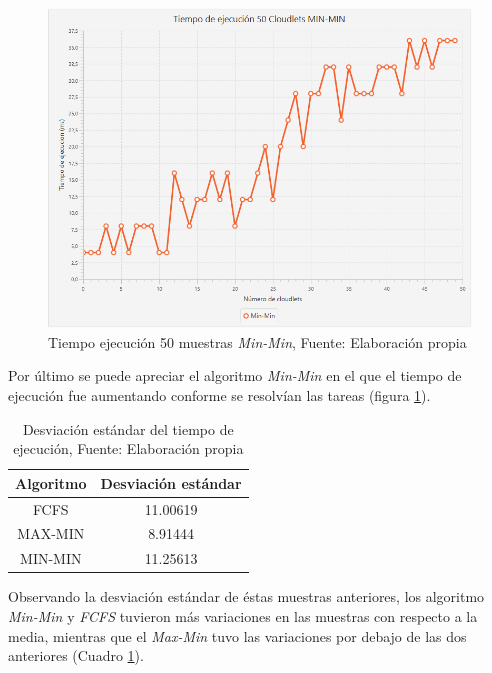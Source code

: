 \newpage
\setcounter{figure}{18}
\renewcommand\thefigure{\arabic{figure}}
\begin{figure}[h!] 
	\centering
	\includegraphics[scale=0.5]{media/min-min}
	\caption{Tiempo ejecuci\'on 50 muestras \textit{Min-Min}, Fuente: Elaboraci\'on propia}
	\label{fig:minmin}
\end{figure}


Por \'ultimo se puede apreciar el algoritmo \textit{Min-Min} en el que el tiempo de ejecuci\'on fue aumentando conforme se resolv\'ian las tareas (figura \ref{fig:minmin}).


\setcounter{table}{4}
\renewcommand\thetable{\arabic{table}}
\begin{table}[h!]
	\centering
	\begin{tabular}{@{}cc@{}}
		\toprule
		{\bf Algoritmo} & \multicolumn{1}{l}{{\bf Desviaci\'on est\'andar}} \\ \midrule
		FCFS & 11.00619 \\
		MAX-MIN & 8.91444 \\
		MIN-MIN & 11.25613 \\ \bottomrule
	\end{tabular}
	\caption{Desviaci\'on est\'andar del tiempo de ejecuci\'on, Fuente: Elaboraci\'on propia}
	\label{tiempotabla}
\end{table}

Observando la desviaci\'on est\'andar de \'estas muestras anteriores, los algoritmo \textit{Min-Min} y \textit{FCFS} tuvieron m\'as variaciones en las muestras con respecto a la media, mientras que el \textit{Max-Min} tuvo las variaciones por debajo de las dos anteriores (Cuadro \ref{tiempotabla}).
